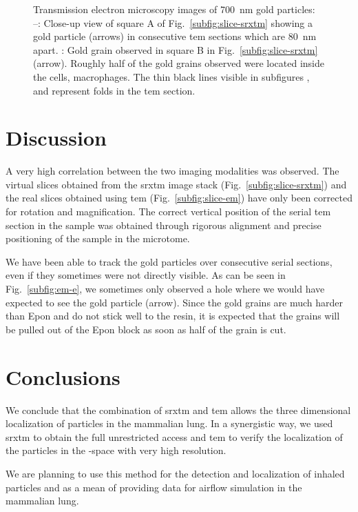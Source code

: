 \begin{figure}[htb]
{		\label{subfig:em-f}%
		}%
	\caption[Transmission electron microscopy images of gold particles]{Transmission electron microscopy images of \SI{700}{\nano\meter} gold particles: --: Close-up view of square A of Fig.~\ref{subfig:slice-srxtm} showing a gold particle (arrows) in consecutive \ac{tem} sections which are \SI{80}{\nano\meter} apart. : Gold grain observed in square B in Fig.~\ref{subfig:slice-srxtm} (arrow). Roughly half of the gold grains observed were located inside the cells, \eg macrophages. The thin black lines visible in subfigures ,  and  represent folds in the \ac{tem} section.}%
	\label{fig:srxtm-em}%
\end{figure}

\section{Discussion}
A very high correlation between the two imaging modalities was observed. The virtual slices obtained from the \ac{srxtm} image stack (Fig.~\ref{subfig:slice-srxtm}) and the real slices obtained using \ac{tem} (Fig.~\ref{subfig:slice-em}) have only been corrected for rotation and magnification. The correct vertical position of the serial \ac{tem} section in the sample was obtained through rigorous alignment and precise positioning of the sample in the microtome.

We have been able to track the gold particles over consecutive serial sections, even if they sometimes were not directly visible. As can be seen in Fig.~\ref{subfig:em-e}, we sometimes only observed a hole where we would have expected to see the gold particle (arrow). Since the gold grains are much harder than Epon and do not stick well to the resin, it is expected that the grains will be pulled out of the Epon block as soon as half of the grain is cut.

\section{Conclusions}
We conclude that the combination of \ac{srxtm} and \ac{tem} allows the three dimensional localization of particles in the mammalian lung. In a synergistic way, we used \ac{srxtm} to obtain the full unrestricted \threed access and \ac{tem} to verify the localization of the particles in the \threed-space with very high resolution. 

We are planning to use this method for the detection and localization of inhaled particles and as a mean of providing data for airflow simulation in the mammalian lung.

